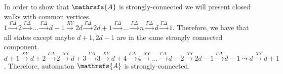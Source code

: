 \documentclass[11pt]{llncs}
\newcommand{\A}{\mathrsfs{A}}
\newcommand{\G}{\Gamma}
\newcommand{\D}{\Delta}
\begin{document}
In order to show that $\A$ is strongly-connected we will present closed walks with common vertices.
$1\xrightarrow{\G\D}2\xrightarrow{\G\D}\ldots\xrightarrow{\G\D}d-1\xrightarrow{XY}2d\xrightarrow{\G\D}2d+1\xrightarrow{\G\D}\ldots
\xrightarrow{\G\D}n\xrightarrow{\G\D}d\xrightarrow{\G\D}1$. Therefore, we have that all states except maybe $\overline{d+1,2d -1}$ are
in the same strongly connected component.
$d+1\xrightarrow{XY}d+2\xrightarrow{\G\D}2\xrightarrow{XY}d+3\xrightarrow{\G\D}3\xrightarrow{XY}d+4\xrightarrow{\G\D}
4\xrightarrow{XY}\ldots\xrightarrow{\G\D}d-2\xrightarrow{XY}2d-1\xrightarrow{\G\D}d-1\leadsto d\xrightarrow{XY}d+1$. 
Therefore, automaton $\A$ is strongly-connected.
\end{document}
